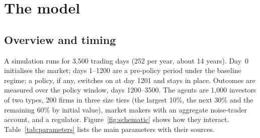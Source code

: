 \documentclass[11pt]{article}
\begin{document}
\section{The model}\label{sec:model}

\subsection{Overview and timing}

A simulation runs for 3,500 trading days (252 per year, about 14 years). Day~0 initialises the market; days 1--1200 are a pre-policy period under the baseline regime; a policy, if any, switches on at day 1201 and stays in place. Outcomes are measured over the policy window, days 1200--3500. The agents are 1,000 investors of two types, 200 firms in three size tiers (the largest 10\%, the next 30\% and the remaining 60\% by initial value), market makers with an aggregate noise-trader account, and a regulator. Figure~\ref{fig:schematic} shows how they interact. Table~\ref{tab:parameters} lists the main parameters with their sources.
\end{document}
